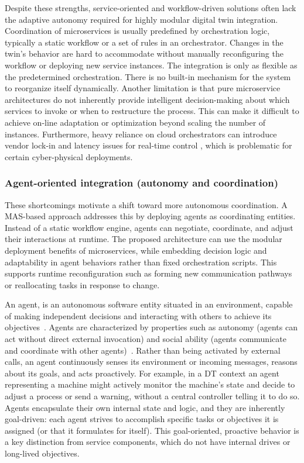 Despite these strengths, service-oriented and workflow-driven solutions often lack the adaptive autonomy required for highly modular digital twin integration. Coordination of microservices is usually predefined by orchestration logic, typically a static workflow or a set of rules in an orchestrator. Changes in the twin's behavior are hard to accommodate without manually reconfiguring the workflow or deploying new service instances. The integration is only as flexible as the predetermined orchestration. There is no built-in mechanism for the system to reorganize itself dynamically. Another limitation is that pure microservice architectures do not inherently provide intelligent decision-making about which services to invoke or when to restructure the process. This can make it difficult to achieve on-line adaptation or optimization beyond scaling the number of instances. Furthermore, heavy reliance on cloud orchestrators can introduce vendor lock-in and latency issues for real-time control \cite{marah2024_madtwin}, which is problematic for certain cyber-physical deployments.

\subsubsection{Agent-oriented integration (autonomy and coordination)}
These shortcomings motivate a shift toward more autonomous coordination. A MAS-based approach addresses this by deploying agents as coordinating entities. Instead of a static workflow engine, agents can negotiate, coordinate, and adjust their interactions at runtime. The proposed architecture can use the modular deployment benefits of microservices, while embedding decision logic and adaptability in agent behaviors rather than fixed orchestration scripts. This supports runtime reconfiguration such as forming new communication pathways or reallocating tasks in response to change.

An agent, is an autonomous software entity situated in an environment, capable of making independent decisions and interacting with others to achieve its objectives~\cite{singh2005service}. Agents are characterized by properties such as autonomy (agents can act without direct external invocation) and social ability (agents communicate and coordinate with other agents)~\cite{singh2005service}. Rather than being activated by external calls, an agent continuously senses its environment or incoming messages, reasons about its goals, and acts proactively. For example, in a DT context an agent representing a machine might actively monitor the machine’s state and decide to adjust a process or send a warning, without a central controller telling it to do so. Agents encapsulate their own internal state and logic, and they are inherently goal-driven: each agent strives to accomplish specific tasks or objectives it is assigned (or that it formulates for itself). This goal-oriented, proactive behavior is a key distinction from service components, which do not have internal drives or long-lived objectives.


